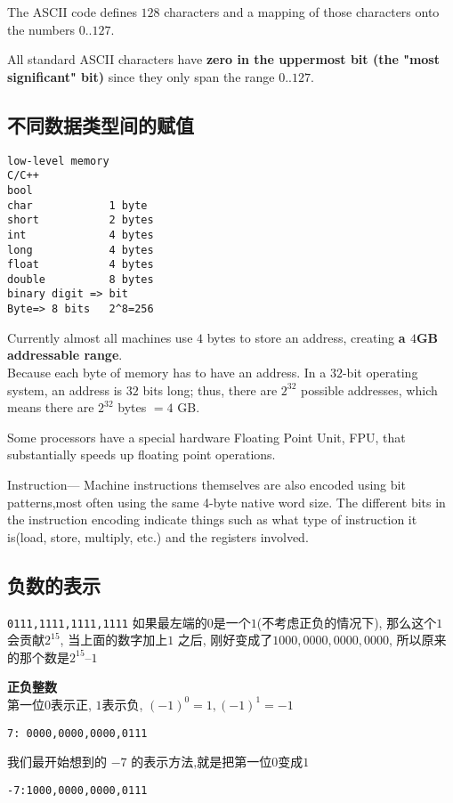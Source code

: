 \documentclass{article}
\begin{document}
The ASCII code defines $128$ characters and a mapping of those characters onto the numbers $0..127$.

All standard ASCII characters have \textbf{zero in the uppermost bit (the "most significant" bit)} since they only span the range $0..127$.

\subsection{不同数据类型间的赋值}
\begin{verbatim}
low-level memory
C/C++
bool
char            1 byte
short           2 bytes
int             4 bytes
long            4 bytes
float           4 bytes
double          8 bytes
binary digit => bit
Byte=> 8 bits   2^8=256
\end{verbatim}
Currently almost all machines use $4$ bytes to store an address, creating \textbf{a $4$GB addressable range}.\\
Because each byte of memory has to have an address. 
In a $32$-bit operating system, an address is $32$ bits long; thus, there are $2^{32}$ possible addresses, which means there are $2^{32}$ bytes $= 4$ GB.

Some processors have a special hardware Floating Point Unit, FPU, that substantially speeds up floating point operations.

Instruction— Machine instructions themselves are also encoded using bit patterns,most often using the same 4-byte native word size. 
The different bits in the instruction encoding indicate things such as what type of instruction it is(load, store, multiply, etc.) and the registers involved.

\subsection{负数的表示}
\verb+0111,1111,1111,1111+ 如果最左端的$0$是一个$1$(不考虑正负的情况下), 那么这个$1$ 会贡献$2^{15}$, 当上面的数字加上$1$ 之后, 刚好变成了$1000,0000,0000,0000$, 所以原来的那个数是$2^{15} – 1$

\textbf{正负整数}\\
第一位$0$表示正, $1$表示负, $(-1)^0=1, (-1)^1 = -1$
\begin{verbatim}
7: 0000,0000,0000,0111
\end{verbatim}
我们最开始想到的 $-7$ 的表示方法,就是把第一位$0$变成$1$
\begin{verbatim}
-7:1000,0000,0000,0111
\end{verbatim}
\end{document}
